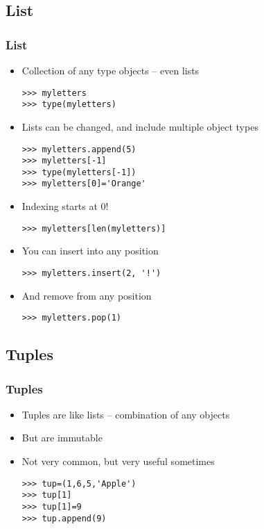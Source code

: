 \documentclass[xcolor=x11names,compress]{beamer}
\renewcommand{\(}{\begin{columns}}
\renewcommand{\)}{\end{columns}}
\newcommand{\<}[1]{\begin{column}{#1}}
\renewcommand{\>}{\end{column}}
\begin{document}
\subsection{List}
\begin{frame}[fragile]
\footnotesize
\frametitle{List}
\begin{itemize}
\item Collection of any type objects -- even lists \pause
\begin{verbatim}
>>> myletters
>>> type(myletters)
\end{verbatim} \pause
\item Lists can be changed, and include multiple object types \pause
\begin{verbatim}
>>> myletters.append(5)
>>> myletters[-1]
>>> type(myletters[-1])
>>> myletters[0]='Orange'
\end{verbatim}
\pause
\item Indexing starts at 0! \pause
\begin{verbatim}
>>> myletters[len(myletters)]
\end{verbatim}
\pause
\item You can insert into any position
\begin{verbatim}
>>> myletters.insert(2, '!')
\end{verbatim}
\pause
\item And remove from any position \pause
\begin{verbatim}
>>> myletters.pop(1)
\end{verbatim}
\end{itemize}
\end{frame}

\subsection{Tuples}
\begin{frame}[fragile]
\frametitle{Tuples}
\begin{itemize}
\item Tuples are like lists -- combination of any objects \pause
\item But are immutable \pause
\item Not very common, but very useful sometimes \pause
\begin{verbatim}
>>> tup=(1,6,5,'Apple')
>>> tup[1]
>>> tup[1]=9
>>> tup.append(9)
\end{verbatim}
\end{itemize}
\end{frame}
\end{document}
